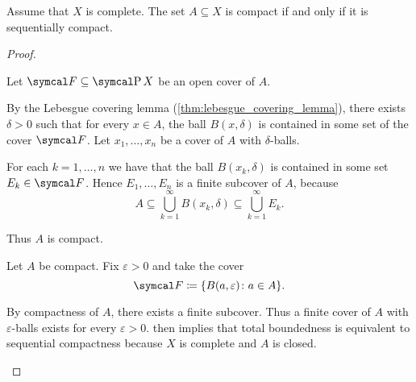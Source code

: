 \begin{theorem}\label{thm:metric_compact_iff_sequentially_compact}
  Assume that \( X \) is complete. The set \( A \subseteq X \) is compact if and only if it is sequentially compact.
\end{theorem}
\begin{proof}
  \begin{description}
    \Implies Let \( \Cal{F} \subseteq \Power X \) be an open cover of \( A \).

    By the Lebesgue covering lemma (\cref{thm:lebesgue_covering_lemma}), there exists \( \delta > 0 \) such that for every \( x \in A \), the ball \( B(x, \delta) \) is contained in some set of the cover \( \Cal{F} \). Let \( x_1, \ldots, x_n \) be a cover of \( A \) with \( \delta \)-balls.

    For each \( k = 1, \ldots, n \) we have that the ball \( B(x_k, \delta) \) is contained in some set \( E_k \in \Cal{F} \). Hence \( E_1, \ldots, E_n \) is a finite subcover of \( A \), because
    \begin{equation*}
      A \subseteq \bigcup_{k=1}^\infty B(x_k, \delta) \subseteq \bigcup_{k=1}^\infty E_k.
    \end{equation*}

    Thus \( A \) is compact.

    \ImpliedBy Let \( A \) be compact. Fix \( \varepsilon > 0 \) and take the cover
    \begin{equation*}
      \Cal{F} \coloneqq \{ B(a, \varepsilon) \colon a \in A \}.
    \end{equation*}

    By compactness of \( A \), there exists a finite subcover. Thus a finite cover of \( A \) with \( \varepsilon \)-balls exists for every \( \varepsilon > 0 \).  then implies that total boundedness is equivalent to sequential compactness because \( X \) is complete and \( A \) is closed.
  \end{description}
\end{proof}

